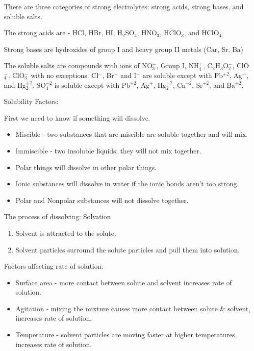 \documentclass[../hchem.tex]{subfiles}
\begin{document}
There are three categories of strong electrolytes: strong acids, strong bases, and soluble salts.

The strong acids are - HCl, HBr, HI, H$_2$SO$_4$, HNO$_3$, HClO$_3$, and HClO$_4$.

Strong bases are hydroxides of group I and heavy group II metals (Car, Sr, Ba)

The soluble salts are compounds with ions of NO$_3^-$, Group I, NH$_4^+$, C$_2$H$_3$O$_2^-$, ClO$_4^-$, ClO$_3^-$ with no exceptions.
Cl$^-$, Br$^-$ and I$^-$ are soluble except with Pb$^{+2}$, Ag$^+$, and Hg$_2^{+2}$.
SO$_4^{-2}$ is soluble except with Pb$^{+2}$, Ag$^+$, Hg$_2^{+2}$, Ca$^{+2}$, Sr$^{+2}$, and Ba$^{+2}$.

Solubility Factors:

First we need to know if something will dissolve.
\begin{itemize}
    \item Miscible - two substances that are miscible are soluble together and will mix.
    \item Immiscible - two insoluble liquids; they will not mix together.
\end{itemize}

\begin{itemize}
    \item Polar things will dissolve in other polar things.
    \item Ionic substances will dissolve in water if the ionic bonds aren't too strong.
    \item Polar and Nonpolar substances will not dissolve together.
\end{itemize}

The process of dissolving: Solvation
\begin{enumerate}
    \item Solvent is attracted to the solute.
    \item Solvent particles surround the solute particles and pull them into solution.
\end{enumerate}

Factors affecting rate of solution:
\begin{itemize}
    \item Surface area - more contact between solute and solvent increases rate of solution.
    \item Agitation - mixing the mixture causes more contact between solute \& solvent, increases rate of solution.
    \item Temperature - solvent particles are moving faster at higher temperatures, increases rate of solution.
\end{itemize}
\end{document}

